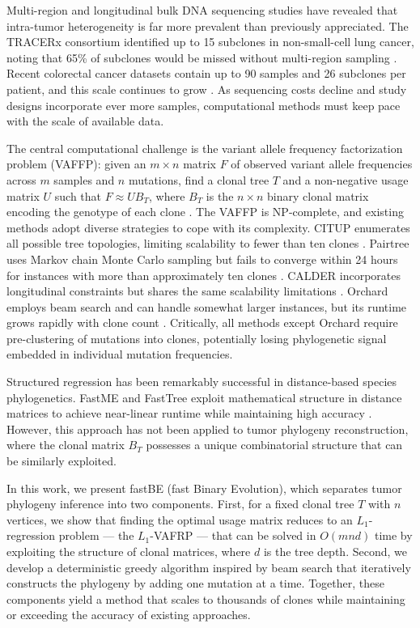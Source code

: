 \documentclass[11pt]{article}
\begin{document}
Multi-region and longitudinal bulk DNA sequencing studies have revealed that intra-tumor heterogeneity is far more prevalent than previously appreciated. The TRACERx consortium identified up to 15 subclones in non-small-cell lung cancer, noting that 65\% of subclones would be missed without multi-region sampling \citep{jamal2017tracking, within2020tracerx}. Recent colorectal cancer datasets contain up to 90 samples and 26 subclones per patient, and this scale continues to grow \citep{leung2017cobalt, caravagna2020subclonal}. As sequencing costs decline and study designs incorporate ever more samples, computational methods must keep pace with the scale of available data.

The central computational challenge is the variant allele frequency factorization problem (VAFFP): given an $m \times n$ matrix $F$ of observed variant allele frequencies across $m$ samples and $n$ mutations, find a clonal tree $T$ and a non-negative usage matrix $U$ such that $F \approx UB_T$, where $B_T$ is the $n \times n$ binary clonal matrix encoding the genotype of each clone \citep{el2005citup}. The VAFFP is NP-complete, and existing methods adopt diverse strategies to cope with its complexity. CITUP enumerates all possible tree topologies, limiting scalability to fewer than ten clones \citep{el2005citup}. Pairtree uses Markov chain Monte Carlo sampling but fails to converge within 24 hours for instances with more than approximately ten clones \citep{wintersinger2022pairtree}. CALDER incorporates longitudinal constraints but shares the same scalability limitations \citep{myers2022calder}. Orchard employs beam search and can handle somewhat larger instances, but its runtime grows rapidly with clone count \citep{christensen2024orchard}. Critically, all methods except Orchard require pre-clustering of mutations into clones, potentially losing phylogenetic signal embedded in individual mutation frequencies.

Structured regression has been remarkably successful in distance-based species phylogenetics. FastME and FastTree exploit mathematical structure in distance matrices to achieve near-linear runtime while maintaining high accuracy \citep{desper2002fastme, price2010fasttree}. However, this approach has not been applied to tumor phylogeny reconstruction, where the clonal matrix $B_T$ possesses a unique combinatorial structure that can be similarly exploited.

In this work, we present fastBE (fast Binary Evolution), which separates tumor phylogeny inference into two components. First, for a fixed clonal tree $T$ with $n$ vertices, we show that finding the optimal usage matrix reduces to an $L_1$-regression problem --- the $L_1$-VAFRP --- that can be solved in $O(mnd)$ time by exploiting the structure of clonal matrices, where $d$ is the tree depth. Second, we develop a deterministic greedy algorithm inspired by beam search that iteratively constructs the phylogeny by adding one mutation at a time. Together, these components yield a method that scales to thousands of clones while maintaining or exceeding the accuracy of existing approaches.
\end{document}
